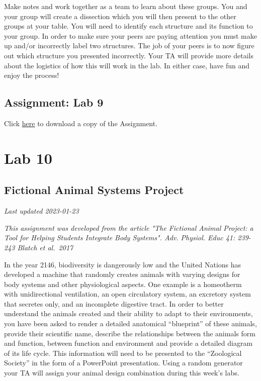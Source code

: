 \documentclass[
]{book}
\begin{document}
Make notes and work together as a team to learn about these groups. You and your group will create a dissection which you will then present to the other groups at your table. You will need to identify each structure and its function to your group. In order to make sure your peers are paying attention you must make up and/or incorrectly label two structures. The job of your peers is to now figure out which structure you presented incorrectly. Your TA will provide more details about the logistics of how this will work in the lab. In either case, have fun and enjoy the process!

\hypertarget{assignment-lab-9}{%
\chapter*{Assignment: Lab 9}\label{assignment-lab-9}}

Click \href{https://osf.io/download/rkjd9}{here} to download a copy of the Assignment.

\hypertarget{part-lab-10}{%
\part*{Lab 10}\label{part-lab-10}}

\hypertarget{fictional-animal-systems-project}{%
\chapter*{Fictional Animal Systems Project}\label{fictional-animal-systems-project}}

\emph{Last updated 2023-01-23}

\emph{This assignment was developed from the article "The Fictional Animal Project: a Tool for Helping Students Integrate Body Systems". Adv. Physiol. Educ 41: 239-243 Blatch et al.~2017}

In the year 2146, biodiversity is dangerously low and the United Nations has developed a machine that randomly creates animals with varying designs for body systems and other physiological aspects. One example is a homeotherm with unidirectional ventilation, an open circulatory system, an excretory system that secretes only, and an incomplete digestive tract. In order to better understand the animals created and their ability to adapt to their environments, you have been asked to render a detailed anatomical ``blueprint'' of these animals, provide their scientific name, describe the relationships between the animal\textquotesingle s form and function, between function and environment and provide a detailed diagram of its life cycle. This information will need to be presented to the ``Zoological Society'' in the form of a PowerPoint presentation. Using a random generator your TA will assign your animal design combination during this week's labs.
\end{document}
